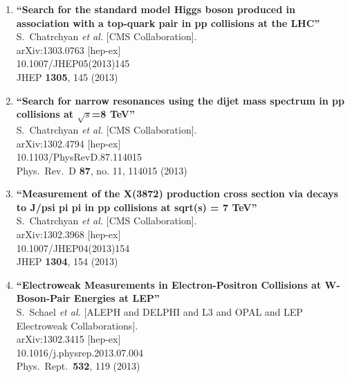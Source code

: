 \documentclass{article}
\begin{document}
\begin{enumerate}
\item%
{\bf ``Search for the standard model Higgs boson produced in association with a top-quark pair in pp collisions at the LHC''}
  \\{}S.~Chatrchyan {\it et al.}  [CMS Collaboration].
  \\{}arXiv:1303.0763 [hep-ex]
    \\{}10.1007/JHEP05(2013)145
\\{}JHEP {\bf 1305}, 145 (2013) %


\item%
{\bf ``Search for narrow resonances using the dijet mass spectrum in pp collisions at $\sqrt{s}$=8  TeV''}
  \\{}S.~Chatrchyan {\it et al.}  [CMS Collaboration].
  \\{}arXiv:1302.4794 [hep-ex]
    \\{}10.1103/PhysRevD.87.114015
\\{}Phys.\ Rev.\ D {\bf 87}, no. 11, 114015 (2013) %


\item%
{\bf ``Measurement of the X(3872) production cross section via decays to J/psi pi pi in pp collisions at sqrt(s) = 7 TeV''}
  \\{}S.~Chatrchyan {\it et al.}  [CMS Collaboration].
  \\{}arXiv:1302.3968 [hep-ex]
    \\{}10.1007/JHEP04(2013)154
\\{}JHEP {\bf 1304}, 154 (2013) %


\item%
{\bf ``Electroweak Measurements in Electron-Positron Collisions at W-Boson-Pair Energies at LEP''}
  \\{}S.~Schael {\it et al.}  [ALEPH and DELPHI and L3 and OPAL and LEP Electroweak Collaborations].
  \\{}arXiv:1302.3415 [hep-ex]
    \\{}10.1016/j.physrep.2013.07.004
\\{}Phys.\ Rept.\  {\bf 532}, 119 (2013) %



\end{enumerate}
\end{document}
